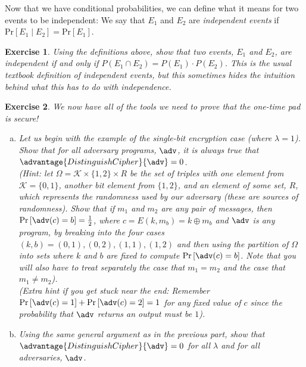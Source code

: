 \documentclass[12pt]{article}
\newcommand{\pr}[1]{\text{Pr}\left[#1\right]}
\newcommand{\K}{\mathcal{K}}
\newtheorem{exercise}{Exercise}
\theoremstyle{definition}
\theoremstyle{remark}
\theoremstyle{definition}
\begin{document}
Now that we have conditional probabilities, we can define what it means for two events to be independent: We say that $E_1$ and $E_2$ are \emph{independent events} if $\pr{E_1\mid E_2} = \pr{E_1}$.

\begin{exercise}
Using the definitions above, show that two events, $E_1$ and $E_2$, are independent if and only if $P(E_1\cap E_2) = P(E_1)\cdot P(E_2)$. This is the usual textbook definition of independent events, but this sometimes hides the intuition behind what this has to do with independence.
\end{exercise}

\begin{exercise} We now have all of the tools we need to prove that the one-time pad is secure!
\begin{enumerate}[(a)]
\item Let us begin with the example of the single-bit encryption case (where $\lambda = 1$). Show that for all adversary programs, $\adv$, it is always true that $\advantage{DistinguishCipher}{\adv} = 0$.\\
(Hint: let $\Omega = \K\times\{1,2\}\times R$ be the set of triples with one element from $\K = \{0,1\}$, another bit element from $\{1,2\}$, and an element of some set, $R$, which represents the randomness used by our adversary (these are sources of randomness). Show that if $m_1$ and $m_2$ are any pair of messages, then $\pr{\adv(c) = b} = \frac{1}{2}$, where $c = E(k, m_b) = k\oplus m_b$ and $\adv$ is any program, by breaking into the four cases $(k,b) = (0,1), (0, 2), (1, 1), (1, 2)$ and then using the partition of $\Omega$ into sets where $k$ and $b$ are fixed to compute $\pr{\adv(c) = b}$. Note that you will also have to treat separately the case that $m_1=m_2$ and the case that $m_1\neq m_2$).\\
(Extra hint if you get stuck near the end: Remember $\pr{\adv(c) = 1} + \pr{\adv(c) = 2} = 1$ for any fixed value of $c$ since the probability that $\adv$ returns an output must be $1$).
\item Using the same general argument as in the previous part, show that $\advantage{DistinguishCipher}{\adv} = 0$ for all $\lambda$ and for all adversaries, $\adv$.
\end{enumerate}
\end{exercise}
\end{document}
